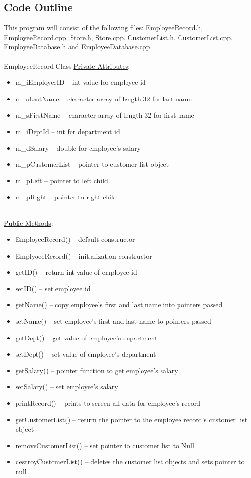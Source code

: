 \documentclass[12pt]{article}%
\begin{document}
\subsection{Code Outline}
This program will consist of the following files: EmployeeRecord.h, EmployeeRecord.cpp, Store.h, Store.cpp,
CustomerList.h, CustomerList.cpp, EmployeeDatabase.h and EmployeeDatabase.cpp.
\hfill\\
\hfill\\
EmployeeRecord Class
\underline{Private Attributes}:
\begin{itemize}
    \item m\_iEmployeeID -- int value for employee id
    \item m\_sLastName -- character array of length 32 for last name
    \item m\_sFirstName -- character array of length 32 for first name
    \item m\_iDeptId -- int for department id
    \item m\_dSalary -- double for employee's salary
    \item m\_pCustomerList -- pointer to customer list object
    \item m\_pLeft -- pointer to left child
    \item m\_pRight -- pointer to right child
    \end{itemize}
    \hfill\\
\underline{Public Methods}:
\begin{itemize}
    \item EmployeeRecord() -- default constructor
    \item EmplyoeeRecord() -- initialization constructor
    \item getID() -- return int value of employee id
    \item setID() -- set employee id
    \item getName() -- copy employee's first and last name into pointers passed
    \item setName() -- set employee's first and last name to pointers passed
    \item getDept() -- get value of employee's department
    \item setDept() -- set value of employee's department
    \item getSalary() -- pointer function to get employee's salary
    \item setSalary() -- set employee's salary
    \item printRecord() -- prints to screen all data for employee's record
    \item getCustomerList() -- return the pointer to the employee record's customer list object
    \item removeCustomerList() -- set pointer to customer list to Null
    \item destroyCustomerList() -- deletes the customer list objects and sets pointer to null
\end{itemize}
\end{document}
